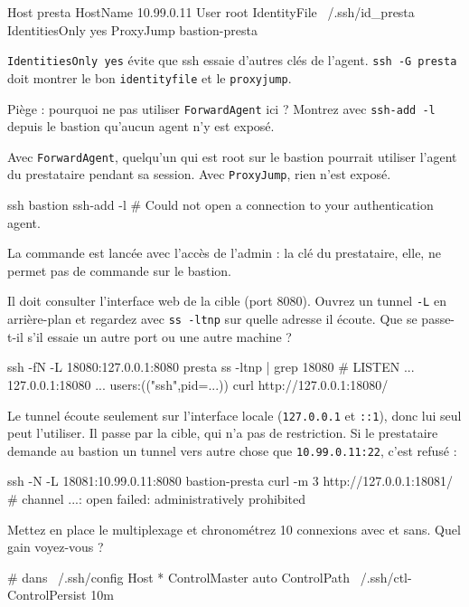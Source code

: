 \documentclass[a4paper,10pt]{exam}
\begin{document}
\begin{questions}
\begin{solution}
\begin{bashcode}
Host presta
    HostName 10.99.0.11
    User root
    IdentityFile ~/.ssh/id_presta
    IdentitiesOnly yes
    ProxyJump bastion-presta
\end{bashcode}
\texttt{IdentitiesOnly yes} évite que ssh essaie d'autres clés de l'agent.
\texttt{ssh -G presta} doit montrer le bon \texttt{identityfile} et le \texttt{proxyjump}.
\end{solution}
\question Piège : pourquoi ne pas utiliser \texttt{ForwardAgent} ici ? Montrez avec
\texttt{ssh-add -l} depuis le bastion qu'aucun agent n'y est exposé.
\begin{solution}
Avec \texttt{ForwardAgent}, quelqu'un qui est root sur le bastion pourrait utiliser
l'agent du prestataire pendant sa session. Avec \texttt{ProxyJump}, rien n'est exposé.
\begin{bashcode}
ssh bastion ssh-add -l
# Could not open a connection to your authentication agent.
\end{bashcode}
La commande est lancée avec l'accès de l'admin : la clé du prestataire, elle, ne permet
pas de commande sur le bastion.
\end{solution}
\question Il doit consulter l'interface web de la cible (port 8080). Ouvrez un tunnel
\texttt{-L} en arrière-plan et regardez avec \texttt{ss -ltnp} sur quelle adresse il
écoute. Que se passe-t-il s'il essaie un autre port ou une autre machine ?
\begin{solution}
\begin{bashcode}
ssh -fN -L 18080:127.0.0.1:8080 presta
ss -ltnp | grep 18080
# LISTEN ... 127.0.0.1:18080 ... users:(("ssh",pid=...))
curl http://127.0.0.1:18080/
\end{bashcode}
Le tunnel écoute seulement sur l'interface locale (\texttt{127.0.0.1} et \texttt{::1}), donc lui seul peut l'utiliser. Il passe
par la cible, qui n'a pas de restriction. Si le prestataire demande au bastion un tunnel
vers autre chose que \texttt{10.99.0.11:22}, c'est refusé :
\begin{bashcode}
ssh -N -L 18081:10.99.0.11:8080 bastion-presta
curl -m 3 http://127.0.0.1:18081/
# channel ...: open failed: administratively prohibited
\end{bashcode}
\end{solution}
\question Mettez en place le multiplexage et chronométrez 10 connexions avec et sans.
Quel gain voyez-vous ?
\begin{solution}
\begin{bashcode}
# dans ~/.ssh/config
Host *
    ControlMaster auto
    ControlPath ~/.ssh/ctl-%
    ControlPersist 10m


\end{bashcode}
\end{solution}
\end{questions}
\end{document}
